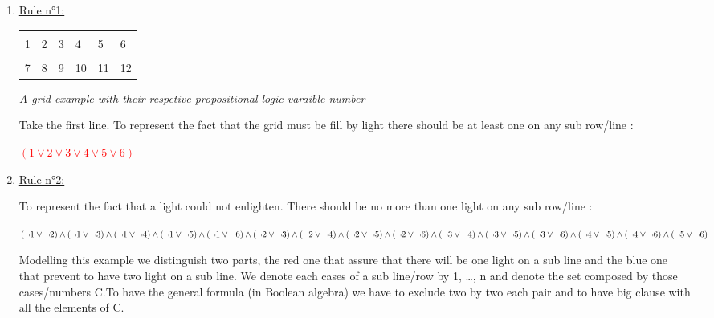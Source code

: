 \documentclass[a4paper]{article}
\begin{document}
\begin{enumerate}

	\item \underline{Rule n°1:}
	\medskip
	\newline
	
		\begin{tabular}{|m{}|m{}|m{}|m{}|m{}|m{}|}
        \hline
         \cellcolor[gray]{0.5} &   &   &   &   &   \\[1ex]
         \cellcolor[gray]{0.5} 1 & 2 & 3 & 4 & 5 & 6 \\[2ex]
        \hline
            &   & \cellcolor[gray]{0.5}   &   &   &   \\[1ex]
          7 & 8 & \cellcolor[gray]{0.5} 9 & 10 & 11 & 12 \\[2ex]
        \hline
      \end{tabular}

\textit{A grid example with their respetive propositional logic varaible number}

\newpage

Take the first line. To represent the fact that the grid must be fill by light there should be at least one on any sub row/line : 
\begin{center}
\textcolor{red}{$ (1 \lor 2 \lor 3 \lor 4 \lor 5 \lor 6) $}
\end{center} 
	\item \underline{Rule n°2:}
	\medskip
	\newline

To represent the fact that a light could not enlighten. There should be no more than one light on any sub row/line : 
\begin{center}
\textcolor{blue}{$ (\neg1 \lor \neg2) \land (\neg1 \lor \neg 3) \land (\neg 1\lor \neg 4) \land (\neg1\lor \neg5) \land (\neg1 \lor \neg 6) \land (\neg 2 \lor \neg 3) \land (\neg2 \lor \neg 4) \land (\neg 2 \lor \neg5) \newline \land (\neg2 \lor \neg6) \land (\neg3 \lor \neg4) \land (\neg3 \lor \neg5) \land (\neg3 \lor \neg6)  \land (\neg 4 \lor \neg 5) \land (\neg 4 \lor \neg 6)\land(\neg5 \lor \neg6)$}
\end{center} 

Modelling this example we distinguish two parts, the red one that assure that there will be one light on a sub line and the blue one that prevent to have two light on a sub line. We denote each cases of a sub line/row by 1, \dots , n and denote the set composed by those cases/numbers C.To have the general formula (in Boolean algebra) we have to exclude two by two each pair and to have big clause with all the elements of C. 


\end{enumerate}
\end{document}
